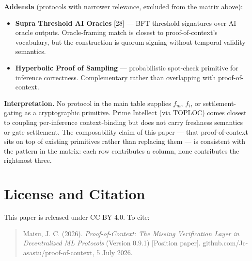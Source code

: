 \documentclass[11pt]{article}
\begin{document}
\textbf{Addenda} (protocols with narrower relevance, excluded from the matrix above):
\begin{itemize}
\item \textbf{Supra Threshold AI Oracles} [28] --- BFT threshold signatures over AI oracle outputs. Oracle-framing match is closest to proof-of-context's vocabulary, but the construction is quorum-signing without temporal-validity semantics.
\item \textbf{Hyperbolic Proof of Sampling} --- probabilistic spot-check primitive for inference correctness. Complementary rather than overlapping with proof-of-context.
\end{itemize}

\textbf{Interpretation.} No protocol in the main table supplies $f_m$, $f_i$, or settlement-gating as a cryptographic primitive. Prime Intellect (via TOPLOC) comes closest to coupling per-inference context-binding but does not carry freshness semantics or gate settlement. The composability claim of this paper --- that proof-of-context sits on top of existing primitives rather than replacing them --- is consistent with the pattern in the matrix: each row contributes a column, none contributes the rightmost three.

\section*{License and Citation}

This paper is released under CC BY 4.0. To cite:

\begin{quote}
Maisu, J. C. (2026). \emph{Proof-of-Context: The Missing Verification Layer in Decentralized ML Protocols} (Version 0.9.1) [Position paper]. github.com/Jc-asastu/proof-of-context, 5 July 2026.
\end{quote}
\end{document}
